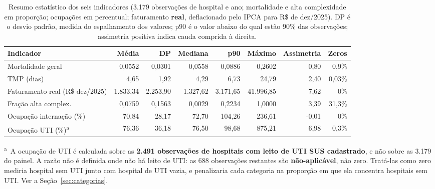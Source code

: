 \begin{table}[H]
\centering
\caption{Resumo estatístico dos seis indicadores (3.179 observações de
hospital e ano; mortalidade e alta complexidade em proporção;
ocupações em percentual; faturamento \textbf{real}, deflacionado pelo
IPCA para R\$ de dez/2025). DP é o desvio padrão, medida do espalhamento
dos valores; p90 é o valor abaixo do qual estão 90\% das observações;
assimetria positiva indica cauda comprida à direita.}
\label{tab:univariada}
\small
\begin{tabular}{lrrrrrrr}
\toprule
Indicador & Média & DP & Mediana & p90 & Máximo & Assimetria & Zeros \\
\midrule
Mortalidade geral      & 0,0552 & 0,0301 & 0,0558 & 0,0886 & 0,2602 & 0,80 & 0,9\% \\
TMP (dias)             & 4,65   & 1,92   & 4,29   & 6,73   & 24,79  & 2,40 & 0,03\% \\
Faturamento real (R\$ dez/2025) & 1.833,34 & 2.253,90 & 1.327,62 & 3.171,65 & 41.996,85 & 7,62 & 0\% \\
Fração alta complex.   & 0,0759 & 0,1563 & 0,0029 & 0,2234 & 1,0000 & 3,39 & 31,3\% \\
Ocupação internação (\%) & 70,84 & 28,17 & 72,70 & 104,26 & 236,61 & -0,01 & 0\% \\
Ocupação UTI (\%)\textsuperscript{a} & 76,36  & 36,18  & 76,50  & 98,68  & 875,21 & 6,98 & 0,3\% \\
\bottomrule
\end{tabular}

\vspace{2pt}
{\footnotesize \textsuperscript{a}~A ocupação de UTI é calculada sobre as
\textbf{2.491 observações de hospitais com leito de UTI SUS cadastrado}, e
não sobre as 3.179 do painel. A razão não é definida onde não há leito de
UTI: as 688 observações restantes são \textbf{não-aplicável}, não zero.
Tratá-las como zero mediria hospital sem UTI junto com hospital de UTI
vazia, e penalizaria cada categoria na proporção em que ela concentra
hospitais sem UTI. Ver a Seção~\ref{sec:categorias}.\par}
\end{table}


